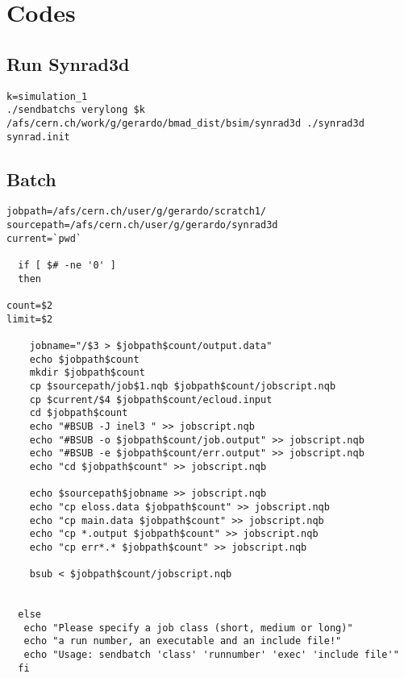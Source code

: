 
\chapter{Codes} %

\label{codes} %


\section{Run Synrad3d}
\begin{verbatim}
k=simulation_1
./sendbatchs verylong $k /afs/cern.ch/work/g/gerardo/bmad_dist/bsim/synrad3d ./synrad3d synrad.init
\end{verbatim}

\section{Batch}
\begin{verbatim}
jobpath=/afs/cern.ch/user/g/gerardo/scratch1/
sourcepath=/afs/cern.ch/user/g/gerardo/synrad3d
current=`pwd`

  if [ $# -ne '0' ]
  then

count=$2
limit=$2

	jobname="/$3 > $jobpath$count/output.data"
	echo $jobpath$count
	mkdir $jobpath$count
	cp $sourcepath/job$1.nqb $jobpath$count/jobscript.nqb
	cp $current/$4 $jobpath$count/ecloud.input
    cd $jobpath$count
	echo "#BSUB -J inel3 " >> jobscript.nqb
	echo "#BSUB -o $jobpath$count/job.output" >> jobscript.nqb
	echo "#BSUB -e $jobpath$count/err.output" >> jobscript.nqb
	echo "cd $jobpath$count" >> jobscript.nqb

    echo $sourcepath$jobname >> jobscript.nqb
	echo "cp eloss.data $jobpath$count" >> jobscript.nqb
	echo "cp main.data $jobpath$count" >> jobscript.nqb
	echo "cp *.output $jobpath$count" >> jobscript.nqb
	echo "cp err*.* $jobpath$count" >> jobscript.nqb

    bsub < $jobpath$count/jobscript.nqb


  else
   echo "Please specify a job class (short, medium or long)"
   echo "a run number, an executable and an include file!"
   echo "Usage: sendbatch 'class' 'runnumber' 'exec' 'include file'"
  fi
\end{verbatim}
